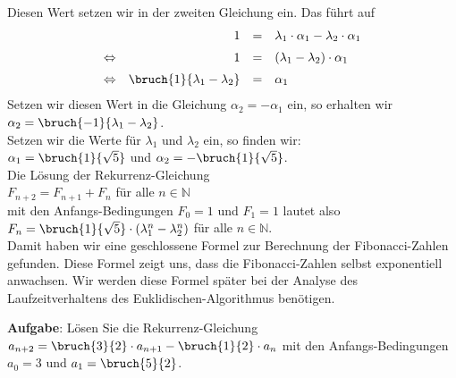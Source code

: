 Diesen Wert setzen wir in der zweiten Gleichung ein.  Das führt auf
\[
\begin{array}{lrcl}
                 & 1 & = & \lambda_1 \cdot \alpha_1 - \lambda_2 \cdot \alpha_1 \\[0.2cm]
 \Leftrightarrow & 1 & = & (\lambda_1 - \lambda_2) \cdot \alpha_1              \\[0.2cm]
 \Leftrightarrow & \bruch{1}{\lambda_1 - \lambda_2} & = & \alpha_1 
\end{array}
\]
Setzen wir diesen Wert in die Gleichung $\alpha_2 = - \alpha_1$ ein, so erhalten wir \\[0.2cm]
\hspace*{1.3cm} 
  $\alpha_2 = \bruch{- 1}{\lambda_1 - \lambda_2}$.
\\[0.2cm]
Setzen wir die  Werte für $\lambda_1$ und $\lambda_2$ ein, so finden wir:  \\[0.2cm]
\hspace*{1.3cm} 
$\alpha_1 = \bruch{1}{\sqrt{5}}$ \quad und \quad $\alpha_2 = - \bruch{1}{\sqrt{5}}$.
\\[0.2cm]
Die Lösung der Rekurrenz-Gleichung \\[0.2cm]
\hspace*{1.3cm} $F_{n+2} = F_{n+1} + F_{n}$ \quad für alle $n \in \mathbb{N}$ \\[0.2cm]
mit den Anfangs-Bedingungen $F_0 = 1$ und $F_1 = 1$   lautet also 
\\[0.2cm]
\hspace*{1.3cm} 
$F_n = \bruch{1}{\sqrt{5}}\cdot \left( \lambda_1^{n} - \lambda_2^{n} \right)$ 
\quad für alle $n \in \mathbb{N}$.  
\\[0.2cm]
Damit haben wir eine geschlossene Formel zur Berechnung der Fibonacci-Zahlen
gefunden.  Diese Formel zeigt uns, dass die Fibonacci-Zahlen selbst exponentiell anwachsen.
Wir werden diese Formel später bei der Analyse des Laufzeitverhaltens des
Euklidischen-Algorithmus benötigen. 

\vspace*{0.2cm}
\noindent
\textbf{Aufgabe}:  Lösen Sie die Rekurrenz-Gleichung 
$a_{n+2} = \bruch{3}{2} \cdot a_{n+1} - \bruch{1}{2}\cdot a_n$ mit
den Anfangs-Bedingungen $a_0 = 3$ und $a_1 = \bruch{5}{2}$.


